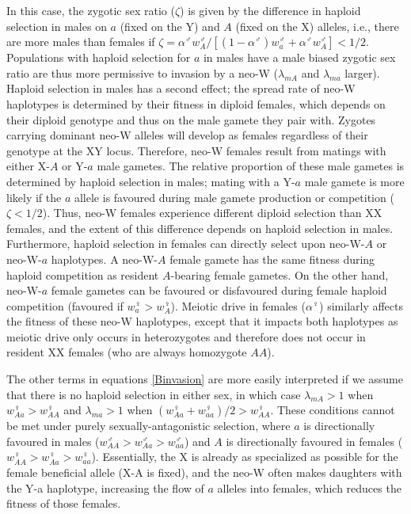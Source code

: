 \documentclass[12pt]{article}
\begin{document}
\noindent
In this case, the zygotic sex ratio ($\zeta$) is given by the difference in haploid selection in males on $a$ (fixed on the Y) and $A$ (fixed on the X) alleles, i.e., there are more males than females if $\zeta = \alpha^\male w_A^\male / [(1-\alpha^\male)w_a^\male + \alpha^\male w_A^\male]<1/2$. %
Populations with haploid selection for $a$ in males have a male biased zygotic sex ratio are thus more permissive to invasion by a neo-W ($\lambda_{mA}$ and $\lambda_{ma}$ larger).
Haploid selection in males has a second effect; the spread rate of neo-W haplotypes is determined by their fitness in diploid females, which depends on their diploid genotype and thus on the male gamete they pair with. 
Zygotes carrying dominant neo-W alleles will develop as females regardless of their genotype at the XY locus. 
Therefore, neo-W females result from matings with either X-$A$ or Y-$a$ male gametes. 
The relative proportion of these male gametes is determined by haploid selection in males; mating with a Y-$a$ male gamete is more likely if the $a$ allele is favoured during male gamete production or competition ($\zeta<1/2$). 
Thus, neo-W females experience different diploid selection than XX females, and the extent of this difference depends on haploid selection in males.
Furthermore, haploid selection in females can directly select upon neo-W-$A$ or neo-W-$a$ haplotypes. 
A neo-W-$A$ female gamete has the same fitness during haploid competition as resident $A$-bearing female gametes. 
On the other hand, neo-W-$a$ female gametes can be favoured or disfavoured during female haploid competition (favoured if $w_{a}^\female>w_{A}^\female$). 
Meiotic drive in females ($\alpha^\female$) similarly affects the fitness of these neo-W haplotypes, except that it impacts both haplotypes as meiotic drive only occurs in heterozygotes and therefore does not occur in resident XX females (who are always homozygote $AA$). 

The other terms in equations \eqref{Binvasion} are more easily interpreted if we assume that there is no haploid selection in either sex, in which case $\lambda_{mA}>1$ when $w_{Aa}^\female>w_{AA}^\female$ and $\lambda_{ma}>1$ when $(w_{Aa}^\female+w_{aa}^\female)/2>w_{AA}^\female$.
These conditions cannot be met under purely sexually-antagonistic selection, where $a$ is directionally favoured in males ($w_{AA}^\male>w_{Aa}^\male>w_{aa}^\male$) and $A$ is directionally favoured in females ($w_{AA}^\female>w_{Aa}^\female>w_{aa}^\female$).  
Essentially, the X is already as specialized as possible for the female beneficial allele (X-A is fixed), and the neo-W often makes daughters with the Y-a haplotype, increasing the flow of $a$ alleles into females, which reduces the fitness of those females.  
\end{document}
